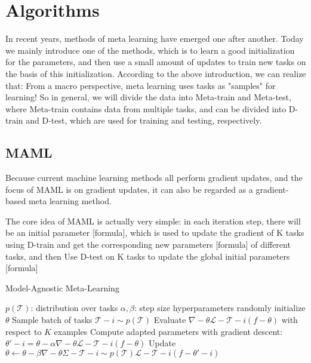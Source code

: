 \section{Algorithms}
In recent years, methods of meta learning have emerged one after another. Today we mainly introduce one of the methods, which is to learn a good initialization for the parameters, and then use a small amount of updates to train new tasks on the basis of this initialization.
According to the above introduction, we can realize that: From a macro 
perspective, meta learning uses tasks as "samples" for learning! So in 
general, we will divide the data into Meta-train and Meta-test, where 
Meta-train contains data from multiple tasks, and can be divided into D-train and D-test, which are used for training and testing, respectively.


\subsection{MAML}
Because current machine learning methods all perform gradient updates, and the focus of MAML is on gradient updates, it can also be regarded as a gradient-based meta learning method.

The core idea of MAML is actually very simple: in each iteration step, there will be an initial parameter [formula], which is used to update the gradient of K tasks using D-train and get the corresponding new parameters [formula] of different tasks, and then Use D-test on K tasks to update the global initial parameters [formula]


\begin{algorithm}
  \caption{Model-Agnostic Meta-Learning}
  \label{MAML}
  \begin{algorithmic}[1]
    \REQUIRE $p(\mathcal{T})$: distribution over tasks
    \REQUIRE $\alpha, \beta$: step size hyperparameters
    \STATE randomly initialize $\theta$
    \STATE Sample batch of tasks $\mathcal{T}-i \sim p(\mathcal{T})$
    \STATE Evaluate $\nabla-\theta \mathcal{L}-{\mathcal{T}-i} (f-\theta)$ with respect to $K$ examples
    \STATE Compute adapted parameters with gradient descent: $\theta'-i = \theta - \alpha\nabla-\theta \mathcal{L}-{\mathcal{T}-i} (f-\theta)$
    \ENDFOR
    \STATE Update $\theta \leftarrow \theta - \beta\nabla-\theta \Sigma-{\mathcal{T}-i \sim p(\mathcal{T})}\mathcal{L}-{\mathcal{T}-i} (f-{\theta'-i})$
    \ENDWHILE
  \end{algorithmic}
\end{algorithm}